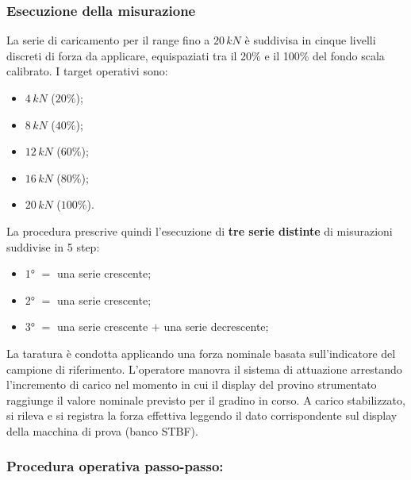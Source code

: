 \documentclass[a4paper, twoside]{article}
\begin{document}
\subsubsection{Esecuzione della misurazione}

La serie di caricamento per il range fino a $20\,kN$ è suddivisa in cinque livelli discreti di forza da applicare, equispaziati tra il 20\% e il 100\% del fondo scala calibrato. I target operativi sono:

\begin{itemize}
    \item $4\,kN$  ($20\%$); 
    \item $8\,kN$  ($40\%$);
    \item $12\,kN$ ($60\%$); 
    \item $16\,kN$ ($80\%$);
    \item $20\,kN$ ($100\%$).
\end{itemize} 

La procedura prescrive quindi l'esecuzione di \textbf{tre serie distinte} di misurazioni suddivise in 5 step:

\begin{itemize}

    \item $1$° $=$ una serie crescente;

    \item $2$° $=$ una serie crescente;

    \item $3$° $=$ una serie crescente $+$ una serie decrescente;

\end{itemize}


La taratura è condotta applicando una forza nominale basata sull'indicatore del campione di riferimento. L'operatore manovra il sistema di attuazione arrestando l'incremento di carico nel momento in cui il display del provino strumentato raggiunge il valore nominale previsto per il gradino in corso. A carico stabilizzato, si rileva e si registra la forza effettiva leggendo il dato corrispondente sul display della macchina di prova (banco STBF).

\subsubsection{Procedura operativa passo-passo:}
\end{document}
